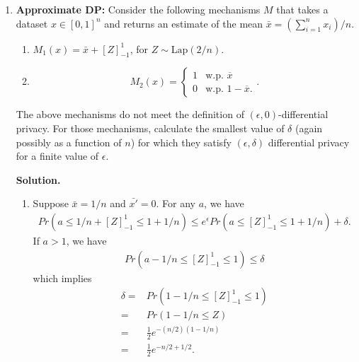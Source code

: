 \documentclass[12pt]{article}
\begin{document}
\begin{enumerate}
\item \textbf{Approximate DP:} Consider the following mechanisms $M$ that takes a dataset $x\in [0,1]^n$ and returns
an estimate of the mean $\bar{x} = (\sum_{i=1}^n x_i)/n$.

\begin{enumerate}[(M1)]
    \item $M_1(x) = \bar{x}+[Z]^1_{-1}$, for $Z\sim \mathrm{Lap}(2/n)$.
    \item 
    $$M_2(x) = \begin{cases} 1 & \text{w.p. } \overline{x}\\
    0 & \text{w.p. } 1-\overline{x}.
    \end{cases}.$$
    
\end{enumerate}
The above mechanisms do not meet the definition of $(\epsilon,0)$-differential privacy.
For those mechanisms, calculate the smallest value of $\delta$ (again possibly as a function of $n$) 
for which they satisfy $(\epsilon,\delta)$ differential privacy for a finite value of $\epsilon$.

\begin{solution}
\textbf{Solution.}\\
\begin{enumerate}
    \item 
    Suppose $\bar{x} = 1/n$ and $\bar{x'}=0$.
    For any $a$, we have 
    \begin{align*}
        Pr(a\leq 1/n+[Z]_{-1}^1\leq 1+1/n) \leq e^\epsilon Pr(a\leq [Z]_{-1}^1\leq 1+1/n) + \delta.
    \end{align*}
    If $a>1$, we have
    \begin{align*}
        Pr(a-1/n\leq [Z]_{-1}^1\leq 1) \leq \delta
    \end{align*}
    which implies
    \begin{align*}
        \delta =& Pr(1-1/n \leq [Z]_{-1}^1 \leq 1)\\
        =& Pr(1-1/n\leq Z)\\
        =& \frac{1}{2} e^{-(n/2)(1-1/n)}\\
        =&\frac{1}{2} e^{-n/2+1/2}.
    \end{align*}


\end{enumerate}
\end{solution}
\end{enumerate}
\end{document}
